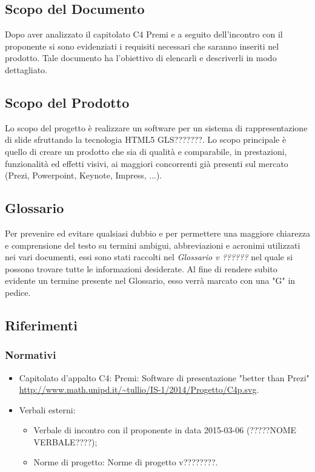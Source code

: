 \subsection{Scopo del Documento}
Dopo aver analizzato il capitolato C4 Premi e a seguito dell'incontro con il proponente si sono evidenziati i requisiti
necessari che saranno inseriti nel prodotto. Tale documento ha l'obiettivo di elencarli e descriverli in modo dettagliato.

\subsection{Scopo del Prodotto}
Lo scopo del progetto è realizzare un software per un sistema di rappresentazione di slide sfruttando la tecnologia HTML5 GLS???????.
Lo scopo principale è quello di creare un prodotto che sia di qualità e comparabile, in prestazioni, funzionalità ed 
effetti visivi, ai maggiori concorrenti già presenti sul mercato (Prezi, Powerpoint, Keynote, Impress, ...).

\subsection{Glossario}
Per prevenire ed evitare qualsiasi dubbio e per permettere una maggiore chiarezza e
comprensione del testo su termini ambigui, abbreviazioni e acronimi utilizzati nei vari documenti,
essi sono stati raccolti nel \textit{Glossario v ??????} nel quale si possono trovare tutte le informazioni desiderate.
Al fine di rendere subito evidente un termine presente nel Glossario, esso verrà marcato con una "G" in pedice.

\subsection{Riferimenti}
\subsubsection{Normativi}
\begin{itemize}
	\item Capitolato d'appalto C4: Premi: Software di presentazione "better than Prezi"
	\newline \url{http://www.math.unipd.it/~tullio/IS-1/2014/Progetto/C4p.svg}.
	\item Verbali esterni:
	\begin{itemize}
		\item Verbale di incontro con il proponente in data 2015-03-06 (?????NOME VERBALE????);
		\item Norme di progetto: Norme di progetto v????????.
	\end{itemize}
\end{itemize}
